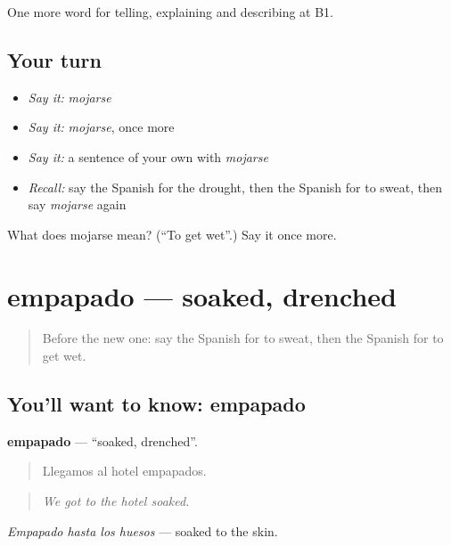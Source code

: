 \begin{grammarlens}[title={What you've built}]
One more word for telling, explaining and describing at B1.
\end{grammarlens}

\subsection*{Your turn}
\begin{itemize}
\raggedright
  \item \emph{Say it:} \emph{mojarse}
  \item \emph{Say it:} \emph{mojarse}, once more
  \item \emph{Say it:} a sentence of your own with \emph{mojarse}
  \item \emph{Recall:} say the Spanish for the drought, then the Spanish for to sweat, then say \emph{mojarse} again
\end{itemize}

\begin{tcolorbox}[breakable,colback=teal!4,colframe=teal!35!black,title={Before you move on}]
What does mojarse mean? (\textquotedblleft{}To get wet\textquotedblright{}.) Say it once more.
\end{tcolorbox}
\section[empapado]{empapado — soaked, drenched}

\label{lesson:ES-C702-empapado}



\begin{quote}
Before the new one: say the Spanish for to sweat, then the Spanish for to get wet.
\end{quote}

\subsection*{You'll want to know: empapado}
\textbf{empapado} — \textquotedblleft{}soaked, drenched\textquotedblright{}.

\begin{quote}
Llegamos al hotel empapados.
\end{quote}

\begin{quote}
\emph{We got to the hotel soaked.}
\end{quote}

\emph{Empapado hasta los huesos} — soaked to the skin.

